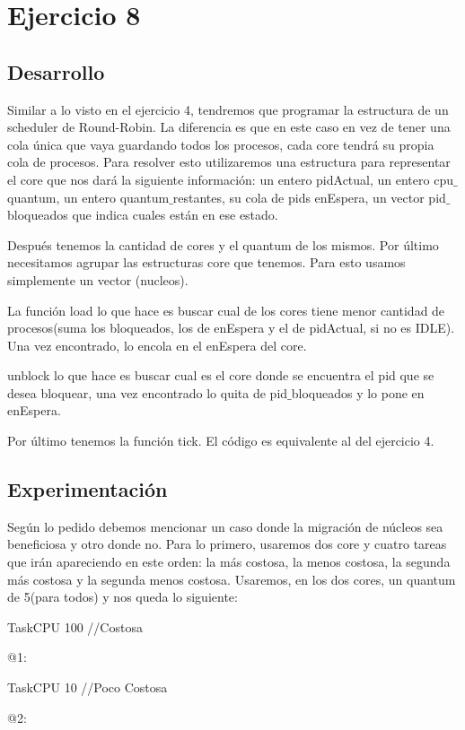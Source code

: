\section{Ejercicio 8}


\subsection{Desarrollo}
Similar  a lo visto en el ejercicio 4, tendremos que programar la estructura de un scheduler de Round-Robin. La diferencia es que en este caso en vez de tener una cola única 
que vaya guardando todos los procesos, cada core tendrá su propia cola de procesos. Para resolver esto utilizaremos una estructura para representar el core que nos dará la 
siguiente información: un entero pidActual, un entero cpu$\_$quantum, un entero quantum$\_$restantes, su cola de pids enEspera, un vector pid$\_$bloqueados que indica cuales están en ese estado.

Después tenemos la cantidad de cores y el quantum de los mismos. Por último necesitamos agrupar las estructuras core que tenemos. Para esto usamos simplemente un vector 
(nucleos).

La función load lo que hace es buscar cual de los cores tiene menor cantidad de procesos(suma los bloqueados, los de enEspera y el de pidActual, si no es IDLE). Una vez 
encontrado, lo encola en el enEspera del core.

unblock lo que hace es buscar cual es el core donde se encuentra el pid que se desea bloquear, una vez encontrado lo quita de pid$\_$bloqueados y lo pone en enEspera.

Por último tenemos la función tick. El código es equivalente al del ejercicio 4.


\subsection{Experimentación}
Según lo pedido debemos mencionar un caso donde la migración de núcleos sea beneficiosa y otro donde no. Para lo primero, usaremos dos core y cuatro tareas que irán apareciendo
en este orden: la más costosa,  la menos costosa, la segunda más costosa y la segunda menos costosa. Usaremos, en los dos cores, un quantum de 5(para todos) y nos queda lo siguiente:

TaskCPU 100   	//Costosa

@1:

TaskCPU 10 	//Poco Costosa

@2:

